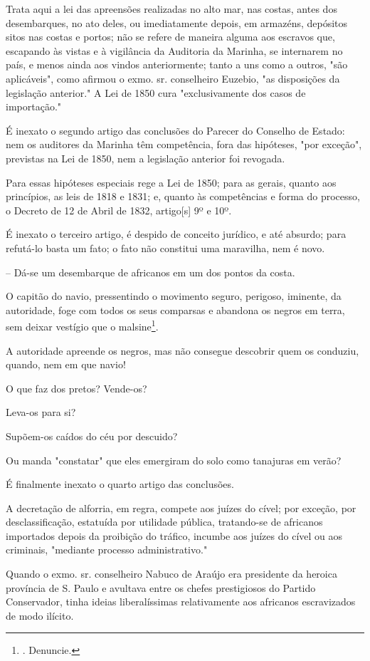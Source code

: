 Trata aqui a lei das apreensões realizadas no alto mar, nas costas,
antes dos desembarques, no ato deles, ou imediatamente depois, em
armazéns, depósitos sitos nas costas e portos; não se refere de maneira
alguma aos escravos que, escapando às vistas e à vigilância da Auditoria
da Marinha, se internarem no país, e menos ainda aos vindos
anteriormente; tanto a uns como a outros, "são aplicáveis", como afirmou
o exmo. sr. conselheiro Euzebio, "as disposições da legislação
anterior." A Lei de 1850 cura "exclusivamente dos casos de importação."

É inexato o segundo artigo das conclusões do Parecer do Conselho de
Estado: nem os auditores da Marinha têm competência, fora das hipóteses,
"por exceção", previstas na Lei de 1850, nem a legislação anterior foi
revogada.

Para essas hipóteses especiais rege a Lei de 1850; para as gerais,
quanto aos princípios, as leis de 1818 e 1831; e, quanto às competências
e forma do processo, o Decreto de 12 de Abril de 1832, artigo{[}s{]} 9º
e 10º.

É inexato o terceiro artigo, é despido de conceito jurídico, e até
absurdo; para refutá-lo basta um fato; o fato não constitui uma
maravilha, nem é novo.

-- Dá-se um desembarque de africanos em um dos pontos da costa.

O capitão do navio, pressentindo o movimento seguro, perigoso, iminente,
da autoridade, foge com todos os seus comparsas e abandona os negros em
terra, sem deixar vestígio que o malsine\footnote{. Denuncie.}.

A autoridade apreende os negros, mas não consegue descobrir quem os
conduziu, quando, nem em que navio!

O que faz dos pretos? Vende-os?

Leva-os para si?

Supõem-os caídos do céu por descuido?

Ou manda "constatar" que eles emergiram do solo como tanajuras em verão?

É finalmente inexato o quarto artigo das conclusões.

A decretação de alforria, em regra, compete aos juízes do cível; por
exceção, por desclassificação, estatuída por utilidade pública,
tratando-se de africanos importados depois da proibição do tráfico,
incumbe aos juízes do cível ou aos criminais, "mediante processo
administrativo."

Quando o exmo. sr. conselheiro Nabuco de Araújo era presidente da
heroica província de S. Paulo e avultava entre os chefes prestigiosos do
Partido Conservador, tinha ideias liberalíssimas relativamente aos
africanos escravizados de modo ilícito.

